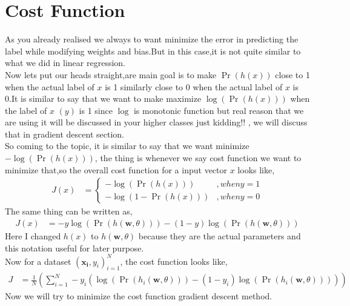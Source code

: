 \documentclass[journal,12pt,onecolumn]{IEEEtran}
\providecommand{\pr}[1]{\ensuremath{\Pr\left(#1\right)}}
\providecommand{\brak}[1]{\ensuremath{\left(#1\right)}}
\theoremstyle{remark}
\numberwithin{equation}{section}
\let\vec\mathbf
\begin{document}
		\section{Cost Function}
		As you already realised we always to want minimize the error in predicting the label while modifying weights and bias.But in this case,it is not quite similar to what we did in linear regression.\\
		Now lets put our heads straight,are main goal is to make $\pr{h\brak{x}}$ close to 1 when the actual label of $x$ is 1 similarly close to 0 when the actual label of $x$ is 0.It is similar to say that we want to make maximize $\log\brak{\pr{h\brak{x}}}$ when the label of $x$ $\brak{y}$ is 1 since $\log$ is monotonic function but real reason that we are using it will be discussed in your higher classes just kidding!! , we will discuss that in gradient descent section.\\
		So coming to the topic, it is similar to say that we want minimize $-\log\brak{\pr{h\brak{x}}}$, the thing is whenever we say cost function we want to minimize that,so the overall cost function for a input vector $x$ looks like,
		\begin{align}
			J\brak{x} &= \begin{cases}
				-\log\brak{\pr{h\brak{x}}} &, when y = 1\\
				-\log\brak{1 - \pr{h\brak{x}}} &, when y = 0
			\end{cases}
		\end{align}
		The same thing can be written as,
		\begin{align}
			J\brak{x} &= -y\log\brak{\pr{h\brak{\vec{w},\theta}}} - \brak{1-y}\log\brak{\pr{h\brak{\vec{w},\theta}}}
		\end{align}
		Here I changed $h\brak{x}$ to $h\brak{\vec{w},\theta}$ because they are the actual parameters and this notation useful for later purpose.\\
		Now for a dataset $\brak{\vec{x_i},y_i}_{i=1}^{N}$, the cost function looks like,
		\begin{align}
			J &= \frac{1}{N}\brak{\sum_{i=1}^{N}-y_{i}\brak{\log\brak{\pr{h_i\brak{\vec{w},\theta}}} - \brak{1-y_i}\log\brak{\pr{h_i\brak{\vec{w},\theta}}}}}
		\end{align}
		Now we will try to minimize the cost function gradient descent method.
\end{document}
